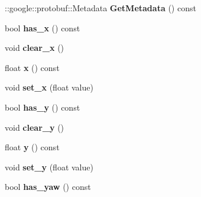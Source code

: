 \begin{DoxyCompactItemize}
\item 
\+::google\+::protobuf\+::\+Metadata {\bfseries Get\+Metadata} () const \hypertarget{classvss__state_1_1Pose_a318666ae85650504a7dd7f2418b01e0c}{}\label{classvss__state_1_1Pose_a318666ae85650504a7dd7f2418b01e0c}

\item 
bool {\bfseries has\+\_\+x} () const \hypertarget{classvss__state_1_1Pose_a60f0b9173d18d8845c77d24e6d76332a}{}\label{classvss__state_1_1Pose_a60f0b9173d18d8845c77d24e6d76332a}

\item 
void {\bfseries clear\+\_\+x} ()\hypertarget{classvss__state_1_1Pose_a4d62819148aa3020a288e9868a0006f3}{}\label{classvss__state_1_1Pose_a4d62819148aa3020a288e9868a0006f3}

\item 
float {\bfseries x} () const \hypertarget{classvss__state_1_1Pose_ab391726391e1e7b9f87e06b7edcc1768}{}\label{classvss__state_1_1Pose_ab391726391e1e7b9f87e06b7edcc1768}

\item 
void {\bfseries set\+\_\+x} (float value)\hypertarget{classvss__state_1_1Pose_aed73f2b005cdb676836600da66a7b8ce}{}\label{classvss__state_1_1Pose_aed73f2b005cdb676836600da66a7b8ce}

\item 
bool {\bfseries has\+\_\+y} () const \hypertarget{classvss__state_1_1Pose_abee5671e3f6cc80e5c71eb157e852f1b}{}\label{classvss__state_1_1Pose_abee5671e3f6cc80e5c71eb157e852f1b}

\item 
void {\bfseries clear\+\_\+y} ()\hypertarget{classvss__state_1_1Pose_adf20a0255b343918c583c1b990422190}{}\label{classvss__state_1_1Pose_adf20a0255b343918c583c1b990422190}

\item 
float {\bfseries y} () const \hypertarget{classvss__state_1_1Pose_a413b079a4e1261a1694c148f7bd8cc76}{}\label{classvss__state_1_1Pose_a413b079a4e1261a1694c148f7bd8cc76}

\item 
void {\bfseries set\+\_\+y} (float value)\hypertarget{classvss__state_1_1Pose_a8f9ff5d89e9ce9cd1de1f3a707efc65f}{}\label{classvss__state_1_1Pose_a8f9ff5d89e9ce9cd1de1f3a707efc65f}

\item 
bool {\bfseries has\+\_\+yaw} () const \hypertarget{classvss__state_1_1Pose_ae9e89cd7eee237cfd7333449e3381cad}{}\label{classvss__state_1_1Pose_ae9e89cd7eee237cfd7333449e3381cad}


\end{DoxyCompactItemize}
